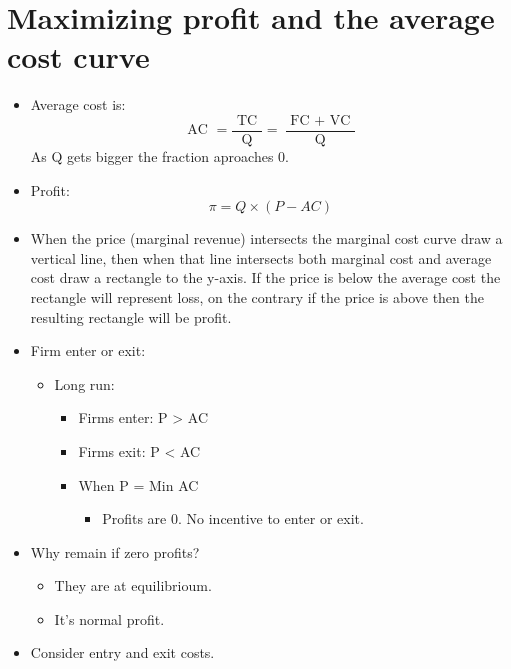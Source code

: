 \documentclass{article}
\begin{document}
\section{Maximizing profit and the average cost curve}
\begin{itemize}
    \item Average cost is: 
        \[
          \text{ AC } = \frac{\text{ TC }}{\text{ Q }} = \frac{\text{ FC }+\text{ VC }}{\text{ Q }} 
        \]
        As Q gets bigger the fraction aproaches 0.
    
    \item Profit: 
        \[
          \pi = Q \times (P-AC)
        \]
    
    \item When the price (marginal revenue) intersects the marginal cost curve draw a vertical line, then when that line intersects both marginal cost and average cost draw a rectangle to the y-axis.  If the price is below the average cost the rectangle will represent loss, on the contrary if the price is above then the resulting rectangle will be profit. 
    \item Firm enter or exit: 
        \begin{itemize}
            \item Long run:
                \begin{itemize}
                    \item Firms enter: P > AC 
                    \item Firms exit: P < AC 
                    \item When P = Min AC 
                        \begin{itemize}
                            \item Profits are 0. No incentive to enter or exit.
                        \end{itemize}
                \end{itemize}
        \end{itemize}
    
    \item Why remain if zero profits? 
        \begin{itemize}
            \item They are at equilibrioum. 
            \item It's normal profit. 
        \end{itemize}
    
    \item Consider entry and exit costs. 
\end{itemize}











\end{document}
